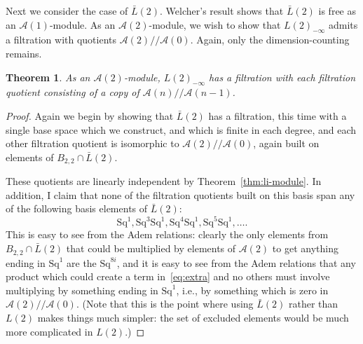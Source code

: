 \documentclass{article}
\newcommand{\A}{\mathcal{A}}
\newcommand{\Sq}{\mathrm{Sq}}
\newcommand{\mmod}{/\!/\!}
\renewcommand{\L}{\bar{L}}
\newcommand{\Lkm}[1][k]{L{(#1)}_{-\infty}}
\newtheorem{thm}{Theorem}
\begin{document}

Next we consider the case of $\L(2)$.  Welcher's result shows that $\L(2)$ is free as an $\A(1)$-module.  As an $\A(2)$-module, we wish to show that $\Lkm[2]$ admits a filtration with quotients $\A(2)\mmod\A(0)$.  Again, only the dimension-counting remains.

\begin{thm}
  As an $\A(2)$-module, $\Lkm[2]$ has a filtration with each filtration quotient consisting of a copy of $\A(n)\mmod\A(n-1)$.
\end{thm}
\begin{proof}
  Again we begin by showing that $\L(2)$ has a filtration, this time with a single base space which we construct, and which is finite in each degree, and each other filtration quotient is isomorphic to $\A(2)\mmod\A(0)$, again built on elements of $B_{2,2}\cap \L(2)$.

  These quotients are linearly independent by Theorem~\ref{thm:li-module}.  In addition, I claim that none of the filtration quotients built on this basis span any of the following basis elements of $\L(2)$:
\begin{equation} \Sq^1, \Sq^3\Sq^1, \Sq^4\Sq^1, \Sq^5\Sq^1, \ldots. \label{eq:extra}\end{equation}
  This is easy to see from the Adem relations: clearly the only elements from $B_{2,2}\cap \L(2)$ that could be multiplied by elements of $\A(2)$ to get anything ending in $\Sq^1$ are the $\Sq^{8i}$, and it is easy to see from the Adem relations that any product which could create a term in~\eqref{eq:extra} and no others must involve multiplying by something ending in $\Sq^1$, i.e., by something which is zero in $\A(2)\mmod\A(0)$.  (Note that this is the point where using $\L(2)$ rather than $L(2)$ makes things much simpler: the set of excluded elements would be much more complicated in $L(2)$.)


\end{proof}
\end{document}
